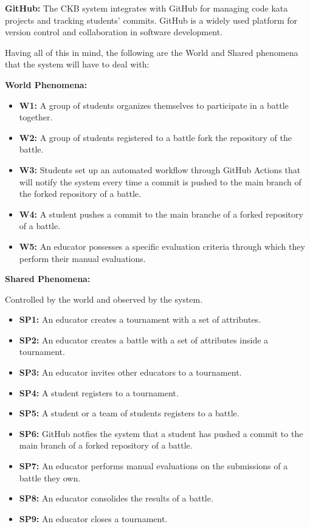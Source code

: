 \documentclass{article}
\begin{document}
\textbf{GitHub:} The CKB system integrates with GitHub for managing code kata projects and tracking students' commits. GitHub is a widely used platform for version control and collaboration in software development.

Having all of this in mind, the following are the World and Shared phenomena that the system will have to deal with:

\textbf{World Phenomena:}

\begin{itemize}
    \item \textbf{W1:} A group of students organizes themselves to participate in a battle together.
    \item \textbf{W2:} A group of students registered to a battle fork the repository of the battle.
    \item \textbf{W3:} Students set up an automated workflow through GitHub Actions that will notify the system every time a commit is pushed to the main branch of the forked repository of a battle.
    \item \textbf{W4:} A student pushes a commit to the main branche of a forked repository of a battle.
    \item \textbf{W5:} An educator possesses a specific evaluation criteria through which they perform their manual evaluations.
\end{itemize}

\textbf{Shared Phenomena:}

Controlled by the world and observed by the system.

\begin{itemize}
    \item \textbf{SP1:} An educator creates a tournament with a set of attributes.
    \item \textbf{SP2:} An educator creates a battle with a set of attributes inside a tournament.
    \item \textbf{SP3:} An educator invites other educators to a tournament.
    \item \textbf{SP4:} A student registers to a tournament.
    \item \textbf{SP5:} A student or a team of students registers to a battle.
    \item \textbf{SP6:} GitHub notfies the system that a student has pushed a commit to the main branch of a forked repository of a battle. 
    \item \textbf{SP7:} An educator performs manual evaluations on the submissions of a battle they own.
    \item \textbf{SP8:} An educator consolides the results of a battle.
    \item \textbf{SP9:} An educator closes a tournament.
\end{itemize}
\end{document}
